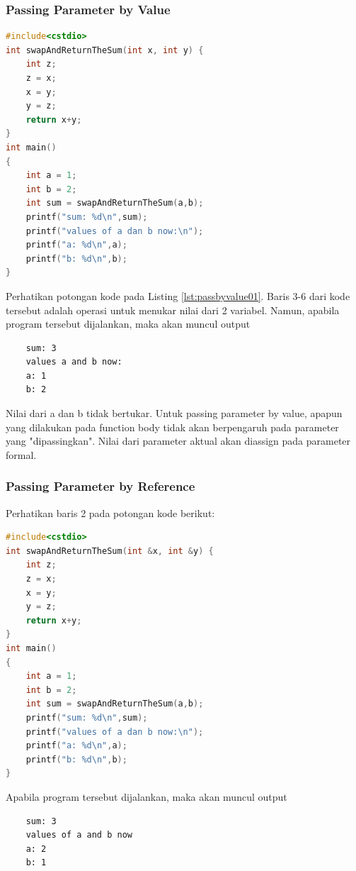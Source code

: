\subsubsection{Passing Parameter by Value}

\begin{lstlisting}[language=c,caption = Passing by Value,label=lst:passbyvalue01]
#include<cstdio>
int swapAndReturnTheSum(int x, int y) {
    int z;
    z = x;
    x = y;
    y = z;
    return x+y;
}
int main()
{
    int a = 1;
    int b = 2;
    int sum = swapAndReturnTheSum(a,b);
    printf("sum: %d\n",sum);
    printf("values of a dan b now:\n");
    printf("a: %d\n",a);
    printf("b: %d\n",b);
}
\end{lstlisting}

Perhatikan potongan kode pada Listing \ref{lst:passbyvalue01}. Baris 3-6 dari kode tersebut adalah operasi untuk menukar nilai dari 2 variabel. Namun, apabila program tersebut dijalankan, maka akan muncul output
\begin{verbatim}
    sum: 3
    values a and b now:
    a: 1
    b: 2
\end{verbatim}
Nilai dari a dan b tidak bertukar. Untuk passing parameter by value, apapun yang dilakukan pada function body tidak akan berpengaruh pada parameter yang "dipassingkan". Nilai dari parameter aktual akan diassign pada parameter formal.

\subsubsection{Passing Parameter by Reference}
Perhatikan baris 2 pada potongan kode berikut:
\begin{lstlisting}[language=c,caption = Passing by Reference,label=lst:passbyreference01]
#include<cstdio>
int swapAndReturnTheSum(int &x, int &y) {
    int z;
    z = x;
    x = y;
    y = z;
    return x+y;
}
int main()
{
    int a = 1;
    int b = 2;
    int sum = swapAndReturnTheSum(a,b);
    printf("sum: %d\n",sum);
    printf("values of a dan b now:\n");
    printf("a: %d\n",a);
    printf("b: %d\n",b);
}
\end{lstlisting}
Apabila program tersebut dijalankan, maka akan muncul output
\begin{verbatim}
    sum: 3
    values of a and b now
    a: 2
    b: 1
\end{verbatim}

